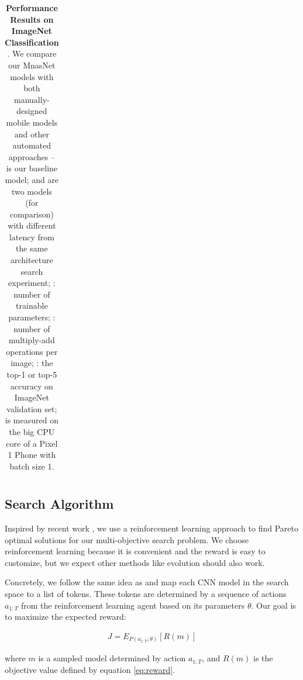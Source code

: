\documentclass[10pt,twocolumn,letterpaper]{article}
\begin{document}
\begin{table}
{\begin{tabular}{l|c|cc|cc|c}
        \toprule[0.2em]
        \end{tabular}
    }
    \caption{
        \textbf{Performance Results on ImageNet Classification} \cite{imagenet15}. We compare our MnasNet models with both manually-designed mobile models and other automated approaches --  is our baseline model; and  are two models (for comparison) with different latency from the same architecture search experiment; : number of trainable parameters; : number of multiply-add operations per image; : the top-1 or top-5 accuracy on ImageNet validation set;  is measured on the big CPU core of a Pixel 1 Phone with batch size 1.
    }
    \label{tab:imagenet}
\end{table}
 

\subsection{Search Algorithm}
Inspired by recent work \cite{nas_cifar17,nas_imagenet18,enas18,hnas18}, we use a reinforcement learning approach to find Pareto optimal solutions for our multi-objective search problem. We choose reinforcement learning because it is convenient and the reward is easy to customize, but we expect other methods like evolution \cite{amoebanets18} should also work. 

Concretely, we follow the same idea as \cite{nas_imagenet18} and map each CNN model in the search space to a list of tokens. These tokens are determined by a sequence of actions $a_{1:T}$ from the reinforcement learning agent based on its parameters $\theta$. Our goal is to maximize the expected reward:

\begin{equation} \label{eq:searchobject}
\begin{aligned}
J=E_{P(a_{1:T}; \theta)} [R(m)]
\end{aligned}
\end{equation}

\noindent
where $m$ is a sampled model  determined by action $a_{1:T}$, and $R(m)$ is the objective value defined by equation \ref{eq:reward}.
\end{document}
